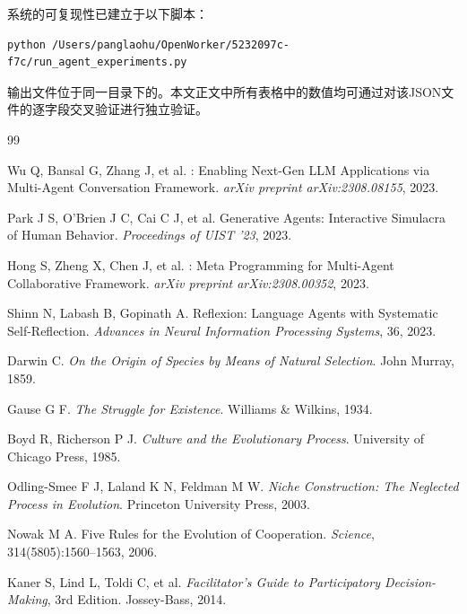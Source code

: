 \documentclass[12pt,a4paper]{ctexart}
\begin{document}
系统的可复现性已建立于以下脚本：
\begin{verbatim}
python /Users/panglaohu/OpenWorker/5232097c-f7c/run_agent_experiments.py
\end{verbatim}
输出文件位于同一目录下的。本文正文中所有表格中的数值均可通过对该JSON文件的逐字段交叉验证进行独立验证。

\newpage
\begin{thebibliography}{99}

Wu Q, Bansal G, Zhang J, et al.
: Enabling Next-Gen LLM Applications via Multi-Agent Conversation Framework.
\newblock \emph{arXiv preprint arXiv:2308.08155}, 2023.

Park J S, O'Brien J C, Cai C J, et al.
\newblock Generative Agents: Interactive Simulacra of Human Behavior.
\newblock \emph{Proceedings of UIST '23}, 2023.

Hong S, Zheng X, Chen J, et al.
: Meta Programming for Multi-Agent Collaborative Framework.
\newblock \emph{arXiv preprint arXiv:2308.00352}, 2023.

Shinn N, Labash B, Gopinath A.
\newblock Reflexion: Language Agents with Systematic Self-Reflection.
\newblock \emph{Advances in Neural Information Processing Systems}, 36, 2023.

Darwin C.
\newblock \emph{On the Origin of Species by Means of Natural Selection}.
\newblock John Murray, 1859.

Gause G F.
\newblock \emph{The Struggle for Existence}.
\newblock Williams \& Wilkins, 1934.

Boyd R, Richerson P J.
\newblock \emph{Culture and the Evolutionary Process}.
\newblock University of Chicago Press, 1985.

Odling-Smee F J, Laland K N, Feldman M W.
\newblock \emph{Niche Construction: The Neglected Process in Evolution}.
\newblock Princeton University Press, 2003.

Nowak M A.
\newblock Five Rules for the Evolution of Cooperation.
\newblock \emph{Science}, 314(5805):1560--1563, 2006.

Kaner S, Lind L, Toldi C, et al.
\newblock \emph{Facilitator's Guide to Participatory Decision-Making}, 3rd Edition.
\newblock Jossey-Bass, 2014.


\end{thebibliography}
\end{document}
